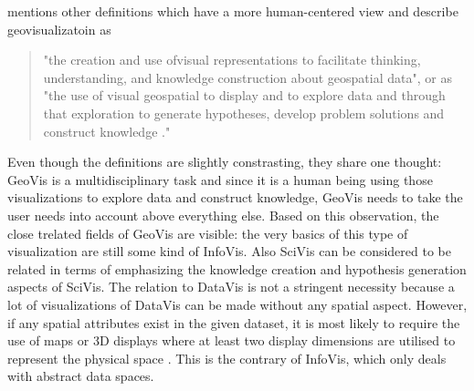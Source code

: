 \begin{enumerate}
\citeauthor{Noellenburg2007} mentions other definitions which have a more human-centered view and describe geovisualizatoin as
\begin{quote}
"the creation and use ofvisual representations to facilitate thinking, understanding, and knowledge construction about geospatial data", or as "the use of visual geospatial to display and to explore data and through that exploration to generate hypotheses, develop problem solutions and construct knowledge ."
\end{quote}

Even though the definitions are slightly constrasting, they share one thought: \ac{GeoVis} is a multidisciplinary task and since it is a human being using those visualizations to explore data and construct knowledge, \ac{GeoVis} needs to take the user needs into account above everything else.
Based on this observation, the close trelated fields of \ac{GeoVis} are visible: the very basics of this type of visualization are still some kind of \ac{InfoVis}. Also \ac{SciVis} can be considered to be related in terms of emphasizing the knowledge creation and hypothesis generation aspects of \ac{SciVis}. The relation to \ac{DataVis} is not a stringent necessity because a lot of visualizations of \ac{DataVis} can be made without any spatial aspect. However, if any spatial attributes exist in the given dataset, it is most likely to require the use of maps or 3D displays where at least two display dimensions are utilised to represent the physical space .
This is the contrary of \ac{InfoVis}, which only deals with abstract data spaces.
\end{enumerate}